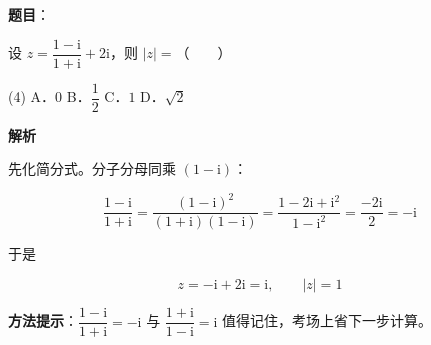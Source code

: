 \begin{answer}

\textbf{题目}：

设 $z=\dfrac{1-\mathrm i}{1+\mathrm i}+2\mathrm i$，则 $|z|=$\mbox{（　　）}

\begin{gkopts}(4)
\task A．$0$
\task B．$\dfrac12$
\task C．$1$
\task D．$\sqrt2$
\end{gkopts}

\textbf{解析}

先化简分式。分子分母同乘 $(1-\mathrm i)$：

\nopagebreak[4]
\[\frac{1-\mathrm i}{1+\mathrm i}=\frac{(1-\mathrm i)^{2}}{(1+\mathrm i)(1-\mathrm i)}=\frac{1-2\mathrm i+\mathrm i^{2}}{1-\mathrm i^{2}}=\frac{-2\mathrm i}2=-\mathrm i\]

于是

\nopagebreak[4]
\[z=-\mathrm i+2\mathrm i=\mathrm i,\qquad |z|=1\]

\begin{gktip}
\textbf{方法提示}：$\dfrac{1-\mathrm i}{1+\mathrm i}=-\mathrm i$ 与 $\dfrac{1+\mathrm i}{1-\mathrm i}=\mathrm i$ 值得记住，考场上省下一步计算。
\end{gktip}


\par\medskip

\end{answer}
